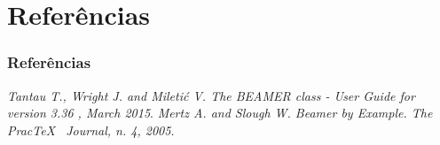 \documentclass{beamer}
\begin{document}
\section{Referências}
\begin{frame}
 \frametitle{Referências}
 \begin{thebibliography}{5}
   \emph{Tantau T., Wright J. and Mileti\'{c} V. The BEAMER class - User Guide for version 3.36
  , March 2015}.
   \emph{Mertz A. and Slough W. Beamer by Example. The Prac\TeX~ Journal, n. 4, 2005.}
 \end{thebibliography}

\end{frame}
\end{document}
